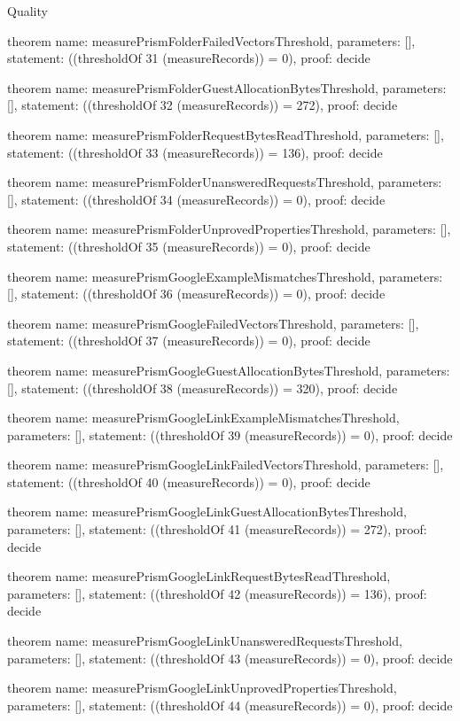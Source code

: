 \begin{lexlean}{Quality}
\begin{semanticmodule}
theorem{
  name: measurePrismFolderFailedVectorsThreshold,
  parameters: [],
  statement: ((thresholdOf 31 (measureRecords)) = 0),
  proof: decide{}
}

theorem{
  name: measurePrismFolderGuestAllocationBytesThreshold,
  parameters: [],
  statement: ((thresholdOf 32 (measureRecords)) = 272),
  proof: decide{}
}

theorem{
  name: measurePrismFolderRequestBytesReadThreshold,
  parameters: [],
  statement: ((thresholdOf 33 (measureRecords)) = 136),
  proof: decide{}
}

theorem{
  name: measurePrismFolderUnansweredRequestsThreshold,
  parameters: [],
  statement: ((thresholdOf 34 (measureRecords)) = 0),
  proof: decide{}
}

theorem{
  name: measurePrismFolderUnprovedPropertiesThreshold,
  parameters: [],
  statement: ((thresholdOf 35 (measureRecords)) = 0),
  proof: decide{}
}

theorem{
  name: measurePrismGoogleExampleMismatchesThreshold,
  parameters: [],
  statement: ((thresholdOf 36 (measureRecords)) = 0),
  proof: decide{}
}

theorem{
  name: measurePrismGoogleFailedVectorsThreshold,
  parameters: [],
  statement: ((thresholdOf 37 (measureRecords)) = 0),
  proof: decide{}
}

theorem{
  name: measurePrismGoogleGuestAllocationBytesThreshold,
  parameters: [],
  statement: ((thresholdOf 38 (measureRecords)) = 320),
  proof: decide{}
}

theorem{
  name: measurePrismGoogleLinkExampleMismatchesThreshold,
  parameters: [],
  statement: ((thresholdOf 39 (measureRecords)) = 0),
  proof: decide{}
}

theorem{
  name: measurePrismGoogleLinkFailedVectorsThreshold,
  parameters: [],
  statement: ((thresholdOf 40 (measureRecords)) = 0),
  proof: decide{}
}

theorem{
  name: measurePrismGoogleLinkGuestAllocationBytesThreshold,
  parameters: [],
  statement: ((thresholdOf 41 (measureRecords)) = 272),
  proof: decide{}
}

theorem{
  name: measurePrismGoogleLinkRequestBytesReadThreshold,
  parameters: [],
  statement: ((thresholdOf 42 (measureRecords)) = 136),
  proof: decide{}
}

theorem{
  name: measurePrismGoogleLinkUnansweredRequestsThreshold,
  parameters: [],
  statement: ((thresholdOf 43 (measureRecords)) = 0),
  proof: decide{}
}

theorem{
  name: measurePrismGoogleLinkUnprovedPropertiesThreshold,
  parameters: [],
  statement: ((thresholdOf 44 (measureRecords)) = 0),
  proof: decide{}
}


\end{semanticmodule}
\end{lexlean}
